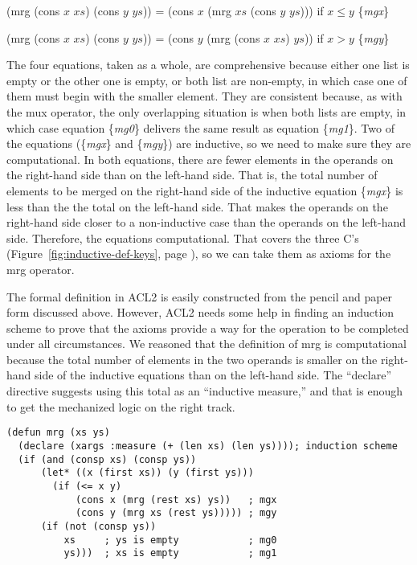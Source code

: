 \hspace{1cm} (mrg (cons $x$ $xs$) (cons $y$ $ys$)) = (cons $x$ (mrg $xs$ (cons $y$ $ys$))) if $x \le y$ \hfill \{\emph{mgx}\}

\hspace{1cm} (mrg (cons $x$ $xs$) (cons $y$ $ys$)) = (cons $y$ (mrg (cons $x$ $xs$) $ys$)) if $x > y$  \hfill \{\emph{mgy}\}

The four equations, taken as a whole, are comprehensive
because either one list is empty or the other one is empty,
or both list are non-empty, in which case one of them must begin with the smaller element.
They are consistent because, as with the mux operator, the only overlapping situation is when
both lists are empty, in which case equation \{\emph{mg0}\}
delivers the same result as equation \{\emph{mg1}\}.
Two of the equations (\{\emph{mgx}\} and \{\emph{mgy}\}) are inductive,
so we need to make sure they are computational.
In both equations, there are fewer elements in the operands
on the right-hand side than on the left-hand side.
That is, the total number of elements to be merged
on the right-hand side of the inductive equation \{\emph{mgx}\}
is less than the the total on the left-hand side.
That makes the operands on the right-hand side closer to
a non-inductive case than the operands on the left-hand side.
Therefore, the equations computational.
That covers the three C's
(Figure~\ref{fig:inductive-def-keys}, page \pageref{fig:inductive-def-keys}),
so we can take them as axioms for the mrg operator.

The formal definition in ACL2 is easily constructed from
the pencil and paper form discussed above.
However, ACL2 needs some help in finding an induction scheme
to prove that the axioms provide a way for the operation to
be completed under all circumstances.
We reasoned that the definition of mrg is computational
because the total number of elements in the two operands
is smaller on the right-hand side of the inductive equations
than on the left-hand side.
The ``declare'' directive suggests using
this total as an ``inductive measure,''
and that is enough to get the mechanized logic on the right track.

\label{defun:mrg}
\begin{Verbatim}
(defun mrg (xs ys)
  (declare (xargs :measure (+ (len xs) (len ys)))); induction scheme
  (if (and (consp xs) (consp ys))
      (let* ((x (first xs)) (y (first ys)))
        (if (<= x y)
            (cons x (mrg (rest xs) ys))   ; mgx
            (cons y (mrg xs (rest ys))))) ; mgy
      (if (not (consp ys))
          xs     ; ys is empty            ; mg0
          ys)))  ; xs is empty            ; mg1
\end{Verbatim}


